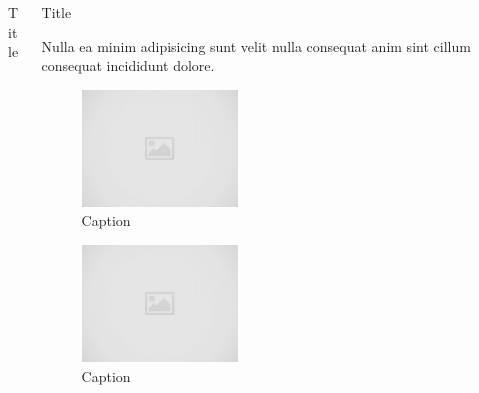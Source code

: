 \documentclass[final]{beamer}
\newlength{\onecolwid}
\newlength{\twocolwid}
\begin{document}
\begin{frame}[t]
\begin{columns}[t]
\begin{column}{\twocolwid}
\begin{columns}[t,totalwidth=\twocolwid]
\begin{column}{\onecolwid}
\begin{block}{Title}
            \end{block}
            
        
        \end{column} %
        
        \begin{column}{\onecolwid}\vspace{-.6in} %
        
            
            \begin{block}{Title}
            
            Nulla ea minim adipisicing sunt velit nulla consequat anim sint cillum consequat incididunt dolore. \\[0.2in]

            \begin{figure}
                \includegraphics[width=0.4\textwidth,keepaspectratio]{images/placeholder.jpg}
                \caption{Caption}
            \end{figure}

            \begin{figure}
                \includegraphics[width=0.4\textwidth,keepaspectratio]{images/placeholder.jpg}
                \caption{Caption}
            \end{figure}
            

\end{block}
\end{column}
\end{columns}
\end{column}
\end{columns}
\end{frame}
\end{document}
